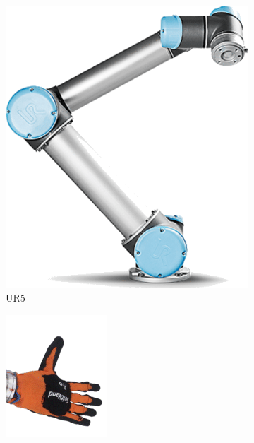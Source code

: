 \documentclass[]{article}
\begin{document}
\begin{figure}[hb!]
\begin{subfigure}[b]{0.22\columnwidth}
		\includegraphics[width=\columnwidth]{ur5}
		\caption{\footnotesize UR5}
		\label{fig:ur5}
	\end{subfigure}
	\hfill
	\begin{subfigure}[b]{0.22\columnwidth}
		\includegraphics[width=\columnwidth]{soft_hand}

\end{subfigure}
\end{figure}
\end{document}
